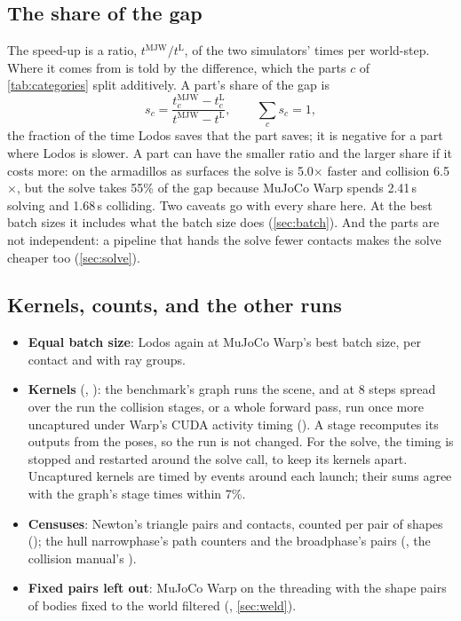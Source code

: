 \subsection{The share of the gap}\label{sec:share}

The speed-up is a ratio, $t^{\mathrm{MJW}} / t^{\mathrm{L}}$, of the two simulators' times per world-step. Where it comes from is told by the difference, which the parts $c$ of \cref{tab:categories} split additively. A part's share of the gap is
\begin{equation}\label{eq:share}
s_c = \frac{t^{\mathrm{MJW}}_c - t^{\mathrm{L}}_c}{t^{\mathrm{MJW}} - t^{\mathrm{L}}}, \qquad \sum_c s_c = 1,
\end{equation}
the fraction of the time Lodos saves that the part saves; it is negative for a part where Lodos is slower. A part can have the smaller ratio and the larger share if it costs more: on the armadillos as surfaces the solve is 5.0$\times$ faster and collision 6.5$\times$, but the solve takes 55\% of the gap because MuJoCo Warp spends 2.41\,\micro s solving and 1.68\,\micro s colliding. Two caveats go with every share here. At the best batch sizes it includes what the batch size does (\cref{sec:batch}). And the parts are not independent: a pipeline that hands the solve fewer contacts makes the solve cheaper too (\cref{sec:solve}).

\subsection{Kernels, counts, and the other runs}\label{sec:kernels}

\begin{itemize}
\item \textbf{Equal batch size}: Lodos again at MuJoCo Warp's best batch size, per contact and with ray groups.
\item \textbf{Kernels} (, ): the benchmark's graph runs the scene, and at 8 steps spread over the run the collision stages, or a whole forward pass, run once more uncaptured under Warp's CUDA activity timing (). A stage recomputes its outputs from the poses, so the run is not changed. For the solve, the timing is stopped and restarted around the solve call, to keep its kernels apart. Uncaptured kernels are timed by events around each launch; their sums agree with the graph's stage times within 7\%.
\item \textbf{Censuses}: Newton's triangle pairs and contacts, counted per pair of shapes (); the hull narrowphase's path counters and the broadphase's pairs (, the collision manual's ).
\item \textbf{Fixed pairs left out}: MuJoCo Warp on the threading with the shape pairs of bodies fixed to the world filtered (, \cref{sec:weld}).
\end{itemize}

